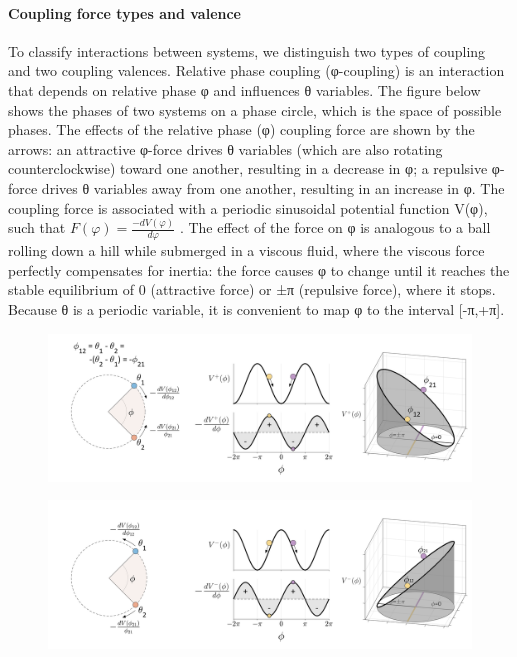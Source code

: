 \paragraph{Coupling force types and valence} 

To classify interactions between systems, we distinguish two types of coupling and two coupling valences. Relative phase coupling (φ-coupling) is an interaction that depends on relative phase φ and influences θ variables. The figure below shows the phases of two systems on a phase circle, which is the space of possible phases. The effects of the relative phase (φ) coupling force are shown by the arrows: an attractive φ-force drives θ variables (which are also rotating counterclockwise) toward one another, resulting in a decrease in φ; a repulsive φ-force drives θ variables away from one another, resulting in an increase in φ. The coupling force is associated with a periodic sinusoidal potential function V(φ), such that  $F\left(\varphi \right)=\frac{-\mathit{dV}\left(\varphi \right)}{\mathit{d\varphi} }$ . The effect of the force on φ is analogous to a ball rolling down a hill while submerged in a viscous fluid, where the viscous force perfectly compensates for inertia: the force causes φ to change until it reaches the stable equilibrium of 0 (attractive force) or ±π (repulsive force), where it stops. Because θ is a periodic variable, it is convenient to map φ to the interval [-π,+π]. 

  
\begin{figure}
\includegraphics[width=\textwidth]{figures/Tilsen-img18.png}
\caption{\missingcaption}
\label{fig:}
\end{figure}
 

  
\begin{figure}
\includegraphics[width=\textwidth]{figures/Tilsen-img19.png}
\caption{\missingcaption}
\label{fig:}
\end{figure}
 

